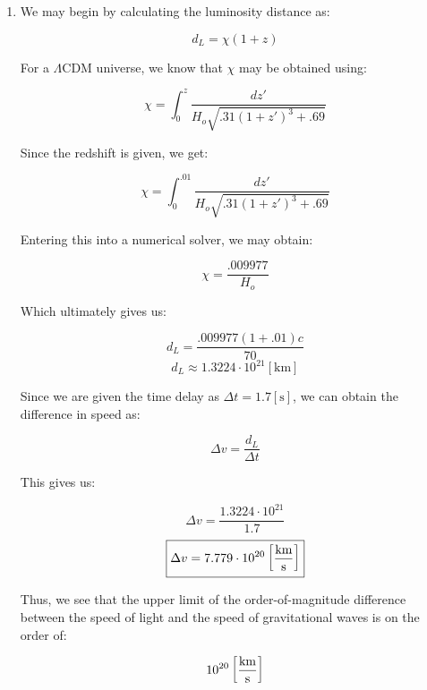 \begin{enumerate}
  \item We may begin by calculating the luminosity distance as:

    $$d_L=\chi(1+z)$$

    For a $\Lambda$CDM universe, we know that $\chi$ may be obtained using:

    $$\chi=\int_0^z \frac{dz'}{H_o\sqrt{.31(1+z')^3+.69}}$$
    
    Since the redshift is given, we get:

    $$\chi=\int_0^{.01} \frac{dz'}{H_o\sqrt{.31(1+z')^3+.69}}$$

    Entering this into a numerical solver, we may obtain:

    $$\chi=\frac{.009977}{H_o}$$

    Which ultimately gives us:

    $$d_L=\frac{.009977(1+.01)c}{70}$$
    $$\boxed{d_L\approx1.3224\cdot10^{21}[\si{\kilo\meter}]}$$

    Since we are given the time delay as $\Delta t =1.7[\si{\second}]$, we can obtain the difference in speed as:

    $$\Delta v=\frac{d_L}{\Delta t}$$

    This gives us:

    $$\Delta v=\frac{1.3224\cdot10^{21}}{1.7}$$
    $$\boxed{\Delta v=7.779\cdot10^{20}\left[ \si{\kilo\meter\over\second} \right]}$$

    Thus, we see that the upper limit of the order-of-magnitude difference between the speed of light and the speed of gravitational waves is on the order of:

    $$10^{20}\left[\si{\kilo\meter\over\second}\right]$$

\end{enumerate}



